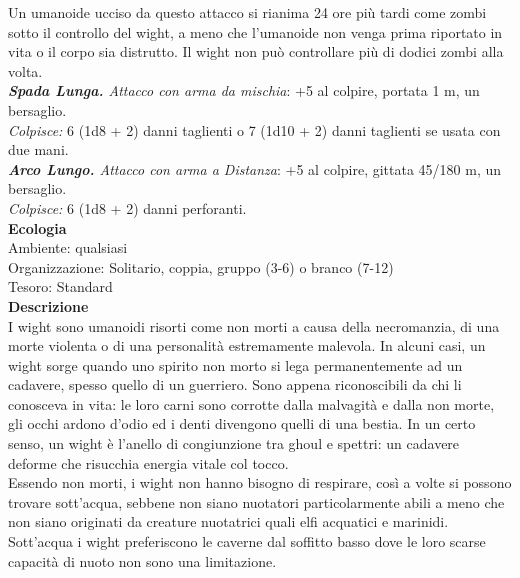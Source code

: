 \begin{multicols}{2}
Un umanoide ucciso da questo attacco si rianima 24 ore più tardi come zombi sotto il controllo del wight, a meno che l'umanoide non venga prima riportato in vita o il corpo sia distrutto. Il wight non può controllare più di dodici zombi alla volta.\\

\emph{\textbf{Spada Lunga.} Attacco con arma da mischia}: +5 al colpire, portata 1 m, un bersaglio.\\
\emph{Colpisce:} 6 (1d8 + 2) danni taglienti o 7 (1d10 + 2) danni taglienti se usata con due mani.\\
\emph{\textbf{Arco Lungo.} Attacco con arma a Distanza}: +5 al colpire, gittata 45/180 m, un bersaglio.\\
\emph{Colpisce:} 6 (1d8 + 2) danni perforanti.\\
\textbf{Ecologia}\\
Ambiente: qualsiasi\\
Organizzazione: Solitario, coppia, gruppo (3-6) o branco (7-12)\\
Tesoro: Standard\\
\textbf{Descrizione}\\
I wight sono umanoidi risorti come non morti a causa della necromanzia, di una morte violenta o di una personalità estremamente malevola. In alcuni casi, un wight sorge quando uno spirito non morto si lega permanentemente ad un cadavere, spesso quello di un guerriero. Sono appena riconoscibili da chi li conosceva in vita: le loro carni sono corrotte dalla malvagità e dalla non morte, gli occhi ardono d’odio ed i denti divengono quelli di una bestia. In un certo senso, un wight è l'anello di congiunzione tra ghoul e spettri: un cadavere deforme che risucchia energia vitale col tocco.\\

Essendo non morti, i wight non hanno bisogno di respirare, così a volte si possono trovare sott’acqua, sebbene non siano nuotatori particolarmente abili a meno che non siano originati da creature nuotatrici quali elfi acquatici e marinidi. Sott’acqua i wight preferiscono le caverne dal soffitto basso dove le loro scarse capacità di nuoto non sono una limitazione.\\


\end{multicols}
